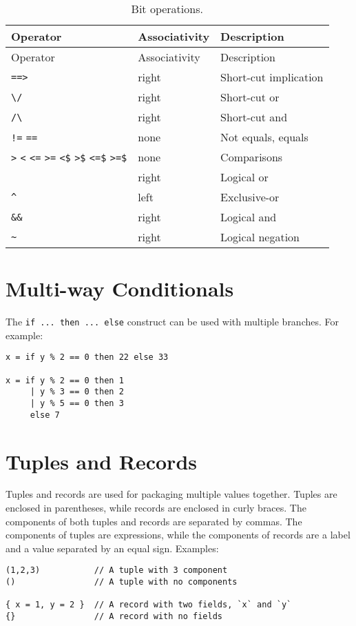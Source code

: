 \begin{longtable}[]{@{}lll@{}}
\caption{Bit operations.}\tabularnewline
\toprule
Operator & Associativity & Description\tabularnewline
\midrule
\endfirsthead
\toprule
Operator & Associativity & Description\tabularnewline
\midrule
\endhead
\texttt{==\textgreater{}} & right & Short-cut implication\tabularnewline
\texttt{\textbackslash{}/} & right & Short-cut or\tabularnewline
\texttt{/\textbackslash{}} & right & Short-cut and\tabularnewline
\texttt{!=} \texttt{==} & none & Not equals, equals\tabularnewline
\texttt{\textgreater{}} \texttt{\textless{}} \texttt{\textless{}=}
\texttt{\textgreater{}=} \texttt{\textless{}\$}
\texttt{\textgreater{}\$} \texttt{\textless{}=\$}
\texttt{\textgreater{}=\$} & none & Comparisons\tabularnewline
\texttt{\textbar{}\textbar{}} & right & Logical or\tabularnewline
\texttt{\^{}} & left & Exclusive-or\tabularnewline
\texttt{\&\&} & right & Logical and\tabularnewline
\texttt{\textasciitilde{}} & right & Logical negation\tabularnewline
\bottomrule
\end{longtable}

\hypertarget{multi-way-conditionals}{%
\section{Multi-way Conditionals}\label{multi-way-conditionals}}

The \texttt{if\ ...\ then\ ...\ else} construct can be used with
multiple branches. For example:

\begin{verbatim}
x = if y % 2 == 0 then 22 else 33

x = if y % 2 == 0 then 1
     | y % 3 == 0 then 2
     | y % 5 == 0 then 3
     else 7
\end{verbatim}

\hypertarget{tuples-and-records}{%
\section{Tuples and Records}\label{tuples-and-records}}

Tuples and records are used for packaging multiple values together.
Tuples are enclosed in parentheses, while records are enclosed in curly
braces. The components of both tuples and records are separated by
commas. The components of tuples are expressions, while the components
of records are a label and a value separated by an equal sign. Examples:

\begin{verbatim}
(1,2,3)           // A tuple with 3 component
()                // A tuple with no components

{ x = 1, y = 2 }  // A record with two fields, `x` and `y`
{}                // A record with no fields
\end{verbatim}

